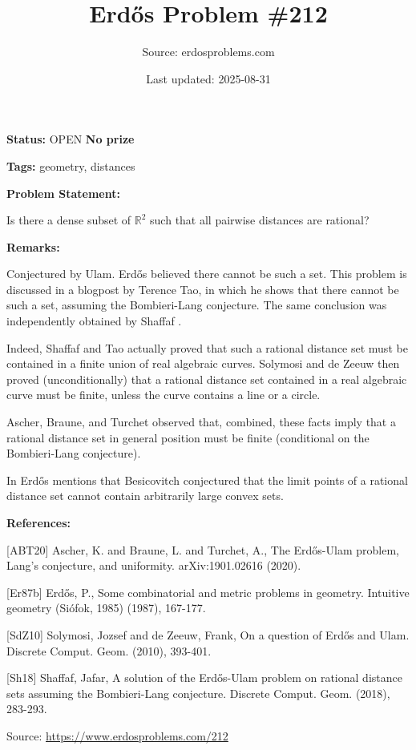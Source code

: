 \documentclass{article}
\title{Erd\H{o}s Problem \#212}
\date{Last updated: 2025-08-31}
\author{Source: erdosproblems.com}
\begin{document}
\maketitle

\noindent\textbf{Status:} OPEN \quad \textbf{No prize}

\noindent\textbf{Tags:} geometry, distances

\medskip
\noindent\textbf{Problem Statement:}

Is there a dense subset of $\mathbb{R}^2$ such that all pairwise distances are rational?

\bigskip
\noindent\textbf{Remarks:}

Conjectured by Ulam. Erd\H{o}s believed there cannot be such a set. This problem is discussed in a blogpost by Terence Tao, in which he shows that there cannot be such a set, assuming the Bombieri-Lang conjecture. The same conclusion was independently obtained by Shaffaf \cite{Sh18}.

Indeed, Shaffaf and Tao actually proved that such a rational distance set must be contained in a finite union of real algebraic curves. Solymosi and de Zeeuw \cite{SdZ10} then proved (unconditionally) that a rational distance set contained in a real algebraic curve must be finite, unless the curve contains a line or a circle.

Ascher, Braune, and Turchet \cite{ABT20} observed that, combined, these facts imply that a rational distance set in general position must be finite (conditional on the Bombieri-Lang conjecture).

In \cite{Er87b} Erd\H{o}s mentions that Besicovitch conjectured that the limit points of a rational distance set cannot contain arbitrarily large convex sets.

\bigskip
\noindent\textbf{References:}

[ABT20] Ascher, K. and Braune, L. and Turchet, A., The Erd\H{o}s-Ulam problem, Lang's conjecture, and uniformity. arXiv:1901.02616 (2020).
 
 [Er87b] Erd\H{o}s, P., Some combinatorial and metric problems in geometry. Intuitive geometry (Si\'{o}fok, 1985) (1987), 167-177.
 
 [SdZ10] Solymosi, Jozsef and de Zeeuw, Frank, On a question of Erd\H{o}s and Ulam. Discrete Comput. Geom. (2010), 393-401.
 
 [Sh18] Shaffaf, Jafar, A solution of the Erd\H{o}s-Ulam problem on rational
distance sets assuming the Bombieri-Lang conjecture. Discrete Comput. Geom. (2018), 283-293.

\bigskip
\noindent\small{Source: \url{https://www.erdosproblems.com/212}}
\end{document}
